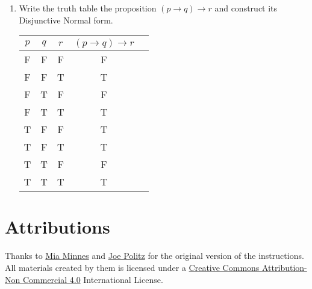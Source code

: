 \documentclass[12pt, oneside]{article}
\begin{document}
\begin{enumerate}
\item Write the truth table the proposition $ ( p \rightarrow q) \rightarrow r$ and construct its Disjunctive Normal form.
\begin{center}
\begin{tabular}{|c|c|c|c|c|}
    \hline
    $p$ & $q$ & $r$ & $ (p \rightarrow q) \rightarrow r$ \\ \hline \hline
    F&F&F& F \\ \hline
    F&F&T& T \\ \hline
    F&T&F& F \\ \hline
    F&T&T& T \\ \hline
    T&F&F& T \\ \hline
    T&F&T& T \\ \hline
    T&T&F& F \\ \hline
    T&T&T& T \\ \hline
    \end{tabular}
\end{center}
\end{enumerate}

\section*{Attributions}

Thanks to \href{http://cseweb.ucsd.edu/~minnes/}{Mia Minnes} and \href{https://jpolitz.github.io/}{Joe Politz} for the original version of the instructions. All materials created by them is licensed under a \href{http://creativecommons.org/licenses/by-nc/4.0/}{Creative Commons Attribution-Non Commercial 4.0} International License.
\end{document}
